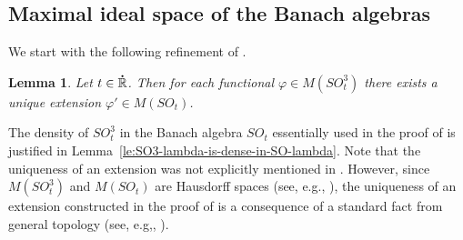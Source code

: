 \documentclass{birkjour}
\newtheorem{lemma}[theorem]{Lemma}
\numberwithin{equation}{section}
\newcommand{\R}{\mathbb{R}}
\newcommand{\dR}{{\bf\dot{\R}}}
\begin{document}
\subsection{Maximal ideal space of the Banach algebras
\boldmath{$SO_{t,X(\R)}$}}
We start with the following refinement of \cite[Lemma~3.4]{KILH13a}.
\begin{lemma}\label{le:extension-from-SOt3-to-SOt}
Let $t\in\dR$. Then for each functional $\varphi\in M(SO_t^3)$ there exists
a unique extension $\varphi'\in M(SO_t)$.
\end{lemma}
The density of $SO_t^3$ in the Banach algebra $SO_t$ essentially used in the
proof of \cite[Lemma~3.4]{KILH13a} is justified in
Lemma~\ref{le:SO3-lambda-is-dense-in-SO-lambda}. Note that the uniqueness of
an extension was not explicitly mentioned in \cite[Lemma~3.4]{KILH13a}.
However, since $M(SO_t^3)$ and $M(SO_t)$ are Hausdorff spaces (see, e.g.,
\cite[Theorem~2.2.3]{K09}), the uniqueness of an extension constructed in
the proof of \cite[Lemma~3.4]{KILH13a} is a consequence of a standard fact
from general topology (see, e.g,, \cite[Theorem~IV.2(b)]{RS80}).
\end{document}
